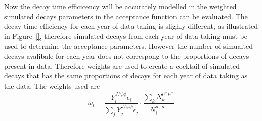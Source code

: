 Now the decay time efficicency will be accurately modelled in the weighted simulated \bsmumu decays parameters in the acceptance function can be evaluated. The decay time efficiency for each year of data taking is slighly different, as illustrated in Figure~\ref{}, therefore simulated decays from each year of data taking must be used to determine the acceptance parameters. However the number of simualted decays avalibale for each year does not correspong to the proportions of decays present in data. Therefore weights are used to create a cocktail of simulated decays that has the same proportions of decays for each year of data taking as the data. The weights used are
\begin{equation}
\omega_{i}  = \frac{Y_{i}^{J/\psi \phi} \epsilon_{i}}{\displaystyle\sum_{j} Y_{j}^{J/\psi \phi} \epsilon_{j}} \cdot \frac{\displaystyle\sum_{k} N_{k}^{\mu^{+}\mu^{-}}}{N_{i}^{\mu^{+}\mu^{-}}}
\end{equation}
